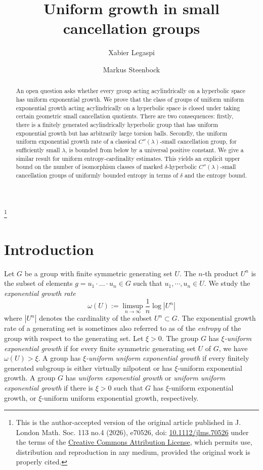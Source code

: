 \documentclass[leqno,a4paper,10pt]{amsart}
\title{Uniform growth in small cancellation groups}
\author{Xabier Legaspi}
\author{Markus Steenbock}
\theoremstyle{plain}
\theoremstyle{definition}
\theoremstyle{remark}
\begin{document}
\let\thefootnote\relax\footnote{This is the author-accepted version of the original article published in J. London Math. Soc. 113 no.4  (2026), e70526, doi: \href{http://dx.doi.org/10.1112/jlms.70526}{10.1112/jlms.70526} under the terms of the \href{http://creativecommons.org/licenses/by/4.0/}{Creative Commons Attribution License}, which permits use, distribution and reproduction in any medium, provided the original work is properly cited.}
\begin{abstract}
An open question asks whether every group acting acylindrically on a hyperbolic space has uniform exponential growth. We prove that the class of groups of uniform uniform exponential growth acting acylindrically on a hyperbolic space is closed under taking certain geometric small cancellation quotients. There are two consequences: firstly, there is a finitely generated acylindrically hyperbolic group that has uniform exponential growth but has arbitrarily large torsion balls. Secondly,  the uniform uniform exponential growth rate of a classical $C''(\lambda)$-small cancellation group, for sufficiently small $\lambda$,  is bounded from below by a universal positive constant. We give a similar result for uniform entropy-cardinality estimates. This yields an explicit upper bound on the number of isomorphism classes of marked $\delta$-hyperbolic $C''(\lambda)$-small cancellation groups of uniformly bounded entropy in terms of $\delta$ and the entropy bound. 
\end{abstract}

\maketitle



\section{Introduction}
\label{sec:introduction}


Let $G$ be a group with finite symmetric generating set $U$. The $n$-th product $U^n$ is the subset of elements $g=u_1\cdot ... \cdot u_n\in G$ such that $u_1,\cdots,u_n\in U$. We study the \emph{exponential growth rate} 
$$\omega(U):=\limsup_{n \to \infty} \frac{1}{n}\log  |U^n|$$
where $|U^n|$ denotes the cardinality of the subset $U^n\subset G$. The exponential growth rate of a generating set is sometimes also referred to as of the  \emph{entropy} of the group with respect to the generating set.  
Let $\xi>0$. The group $G$ has \emph{$\xi$-uniform exponential growth} if for every finite symmetric generating set $U$ of $G$, we have $\omega(U)>\xi$. A group has \emph{$\xi$-uniform uniform exponential growth} if every finitely generated subgroup is either virtually nilpotent or has $\xi$-uniform exponential growth. A group $G$ has \emph{uniform exponential growth} or \emph{uniform uniform exponential growth} if there is $\xi>0$ such that $G$ has $\xi$-uniform exponential growth, or $\xi$-uniform uniform exponential growth, respectively.
\end{document}
